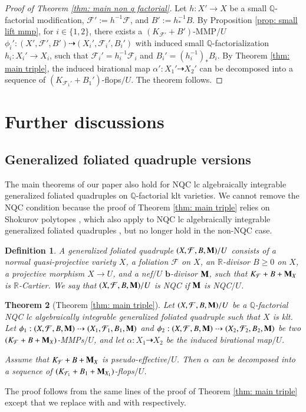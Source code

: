 \documentclass[preprint,12pt]{elsarticle}
\newcommand{\bb}{\bm{b}}
\newcommand{\Mm}{{\bf{M}}}
\newcommand{\Qq}{\mathbb{Q}}
\newcommand{\Rr}{\mathbb{R}}
\newcommand{\Ff}{\mathcal{F}}
\newtheorem{thm}{Theorem}[section]
\newtheorem{defn}[thm]{Definition}
\begin{document}
\begin{proof}[Proof of Theorem \ref{thm: main non q factorial}]
Let $h: X'\rightarrow X$ be a small $\Qq$-factorial modification, $\Ff':=h^{-1}\Ff$, and $B':=h^{-1}_*B$. By Proposition \ref{prop: small lift mmp}, for $i\in\{1,2\}$, there exists a $(K_{\Ff'}+B')$-MMP$/U$ $\phi_i': (X',\Ff',B')\dashrightarrow (X_i',\Ff_i',B_i')$ with induced small $\Qq$-factorialization $h_i: X_i'\rightarrow X_i$, such that $\Ff_i'=h_i^{-1}\Ff_i$ and $B_i'=(h_i^{-1})_*B_i$. By Theorem \ref{thm: main triple}, the induced birational map $\alpha': X_1'\dashrightarrow X_2'$ can be decomposed into a sequence of $(K_{\Ff_1'}+B_1')$-flops$/U$. The theorem follows.
\end{proof}


\section{Further discussions}\label{sec: further discussion}

\subsection{Generalized foliated quadruple versions}

The main theorems of our paper also hold for NQC lc algebraically integrable generalized foliated quadruples on $\Qq$-factorial klt varieties. We cannot remove the NQC condition because the proof of Theorem \ref{thm: main triple} relies on Shokurov polytopes \cite[Theorems 1.12]{LMX24b}, which also apply to NQC lc algebraically integrable generalized foliated quadruples \cite[Theorem A.14]{LMX24b}, but no longer hold in the non-NQC case.

\begin{defn}
A \emph{generalized foliated quadruple} $(X,\Ff,B,\Mm)/U$ consists of a normal quasi-projective variety $X$, a foliation $\Ff$ on $X$, an $\Rr$-divisor $B\geq 0$ on $X$, a projective morphism $X\rightarrow U$, and a nef$/U$ $\bb$-divisor $\Mm$, such that $K_{\Ff}+B+\Mm_X$ is $\mathbb R$-Cartier. We say that $(X,\Ff,B,\Mm)/U$ is \emph{NQC} if $\Mm$ is NQC$/U$. 
\end{defn}


\begin{thm}[Theorem \ref{thm: main triple}]\label{thm: main triple gfq}
Let $(X,\Ff,B,\Mm)/U$ be a $\Qq$-factorial NQC lc algebraically integrable generalized foliated quadruple such that $X$ is klt. Let $\phi_1: (X,\Ff,B,\Mm)\dashrightarrow (X_1,\Ff_1,B_1,\Mm)$ and $\phi_2: (X,\Ff,B,\Mm)\dashrightarrow (X_2,\Ff_2,B_2,\Mm)$ be two $(K_{\Ff}+B+\Mm_X)$-MMPs$/U$, and let $\alpha: X_1\dashrightarrow X_2$ be the induced birational map$/U$.

Assume that $K_{\Ff}+B+\Mm_X$ is pseudo-effective$/U$. Then $\alpha$ can be decomposed into a sequence of $(K_{\Ff_1}+B_1+\Mm_{X_1})$-flops$/U$.
\end{thm}
\begin{pf}
    The proof follows from the same lines of the proof of Theorem \ref{thm: main triple} except that we replace \cite[Lemma 4.13]{LMX24b} with \cite[Lemma A.29]{LMX24b} and \cite[Theorem 1.12]{LMX24b} with \cite[Theorem A.14]{LMX24b} respectively.
\end{pf}
\end{document}
